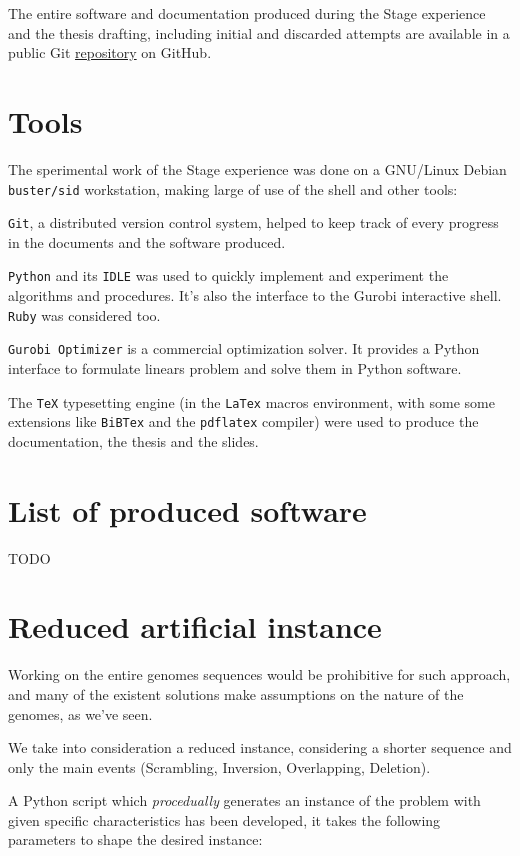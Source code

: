 The entire software and documentation produced during the Stage experience and the thesis drafting, including initial and discarded attempts are available in a public Git \href{https://github.com/avivace/dna-recombination}{repository} \cite{avivace_repo} on GitHub.

\section{Tools}
The sperimental work of the Stage experience was done on a GNU/Linux Debian \texttt{buster/sid} workstation, making large of use of the shell and other tools:

\texttt{Git}, a distributed version control system, helped to keep track of every progress in the documents and the software produced.

\texttt{Python} \cite{Rossum:1995:PRM:869369} and its \texttt{IDLE} was used to quickly implement and experiment the algorithms and procedures. It's also the interface to the Gurobi interactive shell. \texttt{Ruby} was considered too.

\texttt{Gurobi Optimizer} \cite{gurobi} is a commercial optimization solver. It provides a Python interface to formulate linears problem and solve them in Python software.

The \texttt{TeX} typesetting engine (in the \texttt{LaTex} macros environment, with some some extensions like \texttt{BiBTex} and the \texttt{pdflatex} compiler) were used to produce the documentation, the thesis and the slides.

\section{List of produced software}
TODO

\section{Reduced artificial instance}
Working on the entire genomes sequences would be prohibitive for such approach, and many of the existent solutions make assumptions on the nature of the genomes, as we've seen.

We take into consideration a reduced instance, considering a shorter sequence and only the main events (Scrambling, Inversion, Overlapping, Deletion).

A Python script which \textit{procedually} generates an instance of the problem with given specific characteristics has been developed, it takes the following parameters to shape the desired instance:

